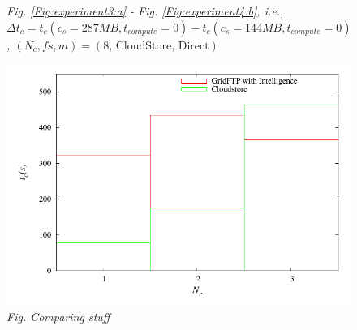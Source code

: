 \documentclass{rspublic}
\begin{document}
\begin{center}
\begin{figure}
{\label{Fig:CloudStore287minus144:c}
}
\caption{\textit{Fig. \ref{Fig:experiment3:a} - Fig. \ref{Fig:experiment4:b}, i.e., $\Delta t_c = t_c(c_s=287 MB, t_{compute}=0) - t_c(c_s=144 MB, t_{compute}=0)$, $(N_c, fs, m) = (\mbox{8, CloudStore, Direct})$}}
\label{Fig:CloudStore287minus144}
\end{figure}
\end{center}

\begin{center}
\begin{figure}
\includegraphics[scale=0.5]{data/graphs/NumberResourcesFigure}
\caption{\textit{Fig. Comparing stuff}}
\label{}
\end{figure}
\end{center}


\end{document}
